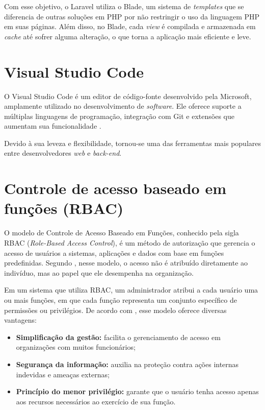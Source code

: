 Com esse objetivo, o Laravel utiliza o Blade, um sistema de \textit{templates} que se diferencia de outras soluções em PHP por não restringir o uso da linguagem PHP em suas páginas. Além disso, no Blade, cada \textit{view} é compilada e armazenada em \textit{cache} até sofrer alguma alteração, o que torna a aplicação mais eficiente e leve.

\section{Visual Studio Code}
O Visual Studio Code é um editor de código-fonte desenvolvido pela Microsoft, amplamente utilizado no desenvolvimento de \textit{software}. Ele oferece suporte a múltiplas linguagens de programação, integração com Git e extensões que aumentam sua funcionalidade \cite{vscode2026}.

Devido à sua leveza e flexibilidade, tornou-se uma das ferramentas mais populares entre desenvolvedores \textit{web} e \textit{back-end}.

\section{Controle de acesso baseado em funções (RBAC)}

O modelo de Controle de Acesso Baseado em Funções, conhecido pela sigla RBAC (\textit{Role-Based Access Control}), é um método de autorização que gerencia o acesso de usuários a sistemas, aplicações e dados com base em funções predefinidas. Segundo , nesse modelo, o acesso não é atribuído diretamente ao indivíduo, mas ao papel que ele desempenha na organização.



Em um sistema que utiliza RBAC, um administrador atribui a cada usuário uma ou mais funções, em que cada função representa um conjunto específico de permissões ou privilégios. De acordo com , esse modelo oferece diversas vantagens:
\begin{itemize}
    \item \textbf{Simplificação da gestão:} facilita o gerenciamento de acesso em organizações com muitos funcionários;
    \item \textbf{Segurança da informação:} auxilia na proteção contra ações internas indevidas e ameaças externas;
    \item \textbf{Princípio do menor privilégio:} garante que o usuário tenha acesso apenas aos recursos necessários ao exercício de sua função.
\end{itemize}

